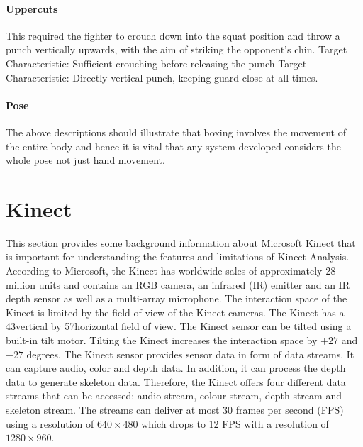 \paragraph{Uppercuts}
This required the fighter to crouch down into the squat position and throw a punch vertically upwards, with the aim of striking the opponent's chin.
Target Characteristic: Sufficient crouching before releasing the punch\newline
Target Characteristic: Directly vertical punch, keeping guard close at all times.\newline

\paragraph{Pose}
The above descriptions should illustrate that boxing involves the movement of the entire body and hence it is vital that any system developed considers the whole pose not just hand movement.

\section{Kinect}
This section provides some background information about Microsoft Kinect that is important for understanding the features and limitations of Kinect Analysis. According to Microsoft, the Kinect  has worldwide sales of approximately 28 million units and contains an RGB camera, an infrared (IR) emitter and an IR depth sensor as well as a multi-array microphone. The interaction space of the Kinect is limited by the field of view of the Kinect cameras. The Kinect has a 43\degree vertical by 57\degree horizontal field of view. The Kinect sensor can be tilted using a built-in tilt motor. Tilting the Kinect increases the interaction space by $+27$ and $-27$ degrees.
The Kinect sensor provides sensor data in form of data streams. It can capture audio, color and depth data. In addition, it can process the depth data to generate skeleton data. Therefore, the Kinect offers four different data streams that can be accessed: audio stream, colour stream, depth stream and skeleton stream. The streams can deliver at most 30 frames per second (FPS) using a resolution of $640\times480$ which drops to 12 FPS with a resolution of $1280\times960$.

